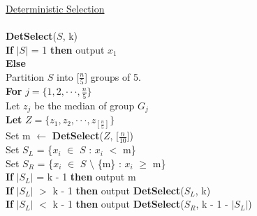 \documentclass[12pt]{article}
\newcommand{\forceindent}{\leavevmode{\parindent=1em\indent}}
\begin{document}
{\large
\underline{Deterministic Selection}\\
\\
\textbf{DetSelect}($S$, k)\\
\textbf{If} $|S|$ = 1 \textbf{then} output $x_1$\\
\textbf{Else}\\
\forceindent Partition $S$ into [$\frac{n}{5}$] groups of 5.\\
\forceindent \textbf{For} $j = \{1,2, \cdot \cdot \cdot, \frac{n}{5}\}$\\
\forceindent \forceindent Let $z_j$ be the median of group $G_j$\\
\forceindent \textbf{Let} $Z = \{z_1,z_2, \cdot \cdot \cdot, z_{[\frac{n}{5}]}\}$\\
\forceindent Set m $\leftarrow$ \textbf{DetSelect}($Z$, [$\frac{n}{10}$])\\
\forceindent Set $S_L$ = \{$x_i$ $\in$ $S$ : $x_i$ $<$ m\}\\
\forceindent Set $S_R$ = \{$x_i$ $\in$ $S$ $\setminus$ \{m\} : $x_i$ $\geq$ m\}\\
\forceindent \textbf{If} $|S_L|$ = k - 1 \textbf{then} output m\\
\forceindent \textbf{If} $|S_L|$ $>$ k - 1 \textbf{then} output \textbf{DetSelect}($S_L$, k)\\
\forceindent \textbf{If} $|S_L|$ $<$ k - 1 \textbf{then} output \textbf{DetSelect}($S_R$, k - 1 - $|S_L|$)
}\\
\end{document}
